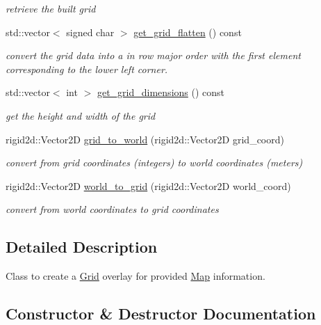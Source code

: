 \begin{DoxyCompactItemize}
\begin{DoxyCompactList}\small\item\em retrieve the built grid \end{DoxyCompactList}\item 
std\+::vector$<$ signed char $>$ \hyperlink{classgrid_1_1Grid_a7c05ad9408e0ff99e36a3196136f3bb7}{get\+\_\+grid\+\_\+flatten} () const
\begin{DoxyCompactList}\small\item\em convert the grid data into a in row major order with the first element corresponding to the lower left corner. \end{DoxyCompactList}\item 
std\+::vector$<$ int $>$ \hyperlink{classgrid_1_1Grid_ab5da2712457e615bb12ca6d5fc1f1b9d}{get\+\_\+grid\+\_\+dimensions} () const
\begin{DoxyCompactList}\small\item\em get the height and width of the grid \end{DoxyCompactList}\item 
rigid2d\+::\+Vector2D \hyperlink{classgrid_1_1Grid_a740d72189efbdf5595c3ddaacc8cdfc4}{grid\+\_\+to\+\_\+world} (rigid2d\+::\+Vector2D grid\+\_\+coord)
\begin{DoxyCompactList}\small\item\em convert from grid coordinates (integers) to world coordinates (meters) \end{DoxyCompactList}\item 
rigid2d\+::\+Vector2D \hyperlink{classgrid_1_1Grid_a9aeb33485b294ab4a07178359db6e3cf}{world\+\_\+to\+\_\+grid} (rigid2d\+::\+Vector2D world\+\_\+coord)
\begin{DoxyCompactList}\small\item\em convert from world coordinates to grid coordinates \end{DoxyCompactList}\end{DoxyCompactItemize}


\subsection{Detailed Description}
Class to create a \hyperlink{classgrid_1_1Grid}{Grid} overlay for provided \hyperlink{structgrid_1_1Map}{Map} information. 

\subsection{Constructor \& Destructor Documentation}
\mbox{\label{classgrid_1_1Grid_a39cd30c1ee231fde7f5a3f228a326ac1}} 
